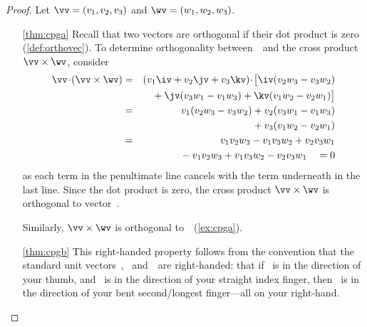 \begin{proof} 
Let \(\vv=(v_1,v_2,v_3)\) and \(\wv=(w_1,w_2,w_3)\).
\begin{enumerate}
\item[\ref{thm:cpga}] Recall that two vectors are orthogonal if their dot product is zero (\autoref{def:orthovec}).
To determine orthogonality between~\vv\ and the cross product \(\vv\times\wv\), consider
\begin{eqnarray*}
\vv\cdot(\vv\times\wv)
&=&(v_1\iv+v_2\jv+v_3\kv)
\cdot\big[\iv(v_2w_3-v_3w_2)
\\&&{}
+\jv(v_3w_1-v_1w_3)
+\kv(v_1w_2-v_2w_1)\big]
\\&=&v_1(v_2w_3-v_3w_2)
+v_2(v_3w_1-v_1w_3)
\\&&{}
+v_3(v_1w_2-v_2w_1)
\\&=&v_1v_2w_3-v_1v_3w_2
+v_2v_3w_1
\\&&{}
-v_1v_2w_3
+v_1v_3w_2-v_2v_3w_1
\quad{}=0
\end{eqnarray*}
as each term in the penultimate line cancels with the term underneath in the last line.
Since the dot product is zero, the cross product \(\vv\times\wv\) is orthogonal to vector~\vv.

Similarly, \(\vv\times\wv\) is orthogonal to~\wv\  (\autoref{ex:cpga}).

\item[\ref{thm:cpgb}] This right-handed property follows from the convention that the standard unit vectors~\iv, \jv\ and~\kv\ are right-handed: that if \iv~is in the direction of your thumb, and \jv~is in the direction of your straight index finger, then \kv~is in the direction of your bent second\slash longest finger---all on your right-hand.


\end{enumerate}
\end{proof}
